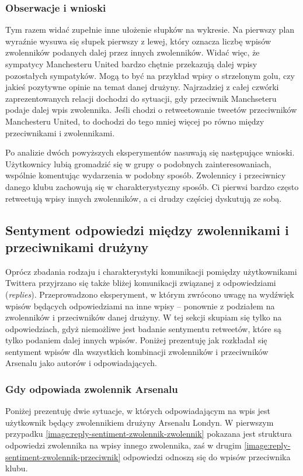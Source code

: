 \subsubsection{Obserwacje i wnioski}
Tym razem widać zupełnie inne ułożenie słupków na wykresie.
Na pierwszy plan wyraźnie wysuwa się słupek pierwszy z lewej, który oznacza
liczbę wpisów zwolenników podanych dalej przez innych zwolenników. Widać więc,
że sympatycy Manchesteru United bardzo chętnie przekazują dalej wpisy 
pozostałych sympatyków. Mogą to być na przykład wpisy o strzelonym golu,
czy jakieś pozytywne opinie na temat danej drużyny. Najrzadziej z całej
czwórki zaprezentowanych relacji dochodzi do sytuacji, gdy przeciwnik
Manchseteru podaje dalej wpis zwolennika. Jeśli chodzi o retweetowanie
tweetów przeciwników Manchesteru United, to dochodzi do tego mniej więcej po
równo między przeciwnikami i zwolennikami.

Po analizie dwóch powyższych eksperymentów nasuwają się następujące wnioski.
Użytkownicy lubią gromadzić się w grupy o podobnych zainteresowaniach,
wspólnie komentując wydarzenia w podobny sposób. Zwolennicy i przeciwnicy
danego klubu zachowują się w charakterystyczny sposób. Ci pierwsi bardzo często
retweetują wpisy innych zwolenników, a ci drudzy częściej dyskutują ze sobą.





\clearpage
\subsection{Sentyment odpowiedzi między zwolennikami i przeciwnikami drużyny}
Oprócz zbadania rodzaju i charakterystyki komunikacji pomiędzy użytkownikami 
Twittera przyjrzano się także bliżej komunikacji związanej z odpowiedziami 
(\textit{replies}). Przeprowadzono eksperyment, w którym zwrócono uwagę
na wydźwięk wpisów będących odpowiedziami na inne wpisy -- ponownie z podziałem
na zwolenników i przeciwników danej drużyny. W tej sekcji skupiam się tylko na
odpowiedziach, gdyż niemożliwe jest badanie sentymentu retweetów, które są
tylko podaniem dalej innych wpisów. Poniżej prezentuję jak rozkładał się
sentyment wpisów dla wszystkich kombinacji zwolenników i przeciwników
Arsenalu jako autorów i odpowiadających.


\subsubsection{Gdy odpowiada zwolennik Arsenalu}
Poniżej prezentuję dwie sytuacje, w których odpowiadającym na wpis jest
użytkownik będący zwolennikiem drużyny Arsenalu Londyn. W pierwszym przypadku
\ref{image:reply-sentiment-zwolennik-zwolennik} pokazana jest struktura
odpowiedzi zwolennika na wpisy innego zwolennika, zaś w drugim
\ref{image:reply-sentiment-zwolennik-przeciwnik} odpowiedzi odnoszą się do
wpisów przeciwnika klubu.

